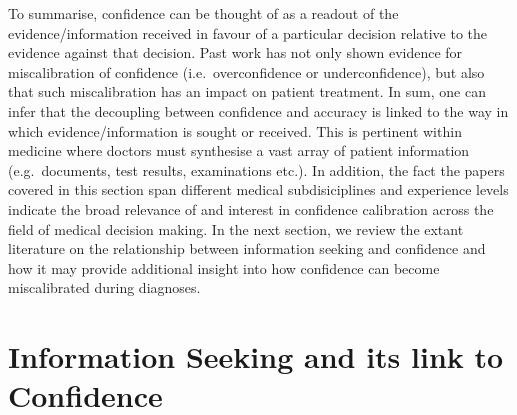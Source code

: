\documentclass[a4paper, nobind]{templates/ociamthesis}
\begin{document}
\hfill\break
To summarise, confidence can be thought of as a readout of the evidence/information received in favour of a particular decision relative to the evidence against that decision. Past work has not only shown evidence for miscalibration of confidence (i.e.~overconfidence or underconfidence), but also that such miscalibration has an impact on patient treatment. In sum, one can infer that the decoupling between confidence and accuracy is linked to the way in which evidence/information is sought or received. This is pertinent within medicine where doctors must synthesise a vast array of patient information (e.g.~documents, test results, examinations etc.). In addition, the fact the papers covered in this section span different medical subdisiciplines and experience levels indicate the broad relevance of and interest in confidence calibration across the field of medical decision making. In the next section, we review the extant literature on the relationship between information seeking and confidence and how it may provide additional insight into how confidence can become miscalibrated during diagnoses.

\section*{Information Seeking and its link to Confidence}\label{information-seeking-and-its-link-to-confidence}
\end{document}
